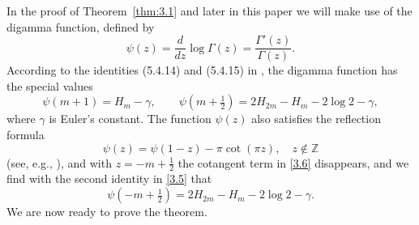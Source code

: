\documentclass{amsart}
\theoremstyle{definition}
\theoremstyle{remark}
\numberwithin{equation}{section}
\begin{document}
In the proof of Theorem~\ref{thm:3.1} and later in this paper we will make use
of the digamma function, defined by
\begin{equation}\label{3.4}
\psi(z)=\frac{d}{dz}\log{\Gamma(z)} = \frac{\Gamma'(z)}{\Gamma(z)}.
\end{equation}
According to the identities (5.4.14) and (5.4.15) in \cite{DLMF}, the digamma
function has the special values
\begin{equation}\label{3.5}
\psi(m+1) = H_m-\gamma,\qquad\psi(m+\tfrac{1}{2}) = 2H_{2m}-H_m-2\log{2}-\gamma,
\end{equation}
where $\gamma$ is Euler's constant. The function $\psi(z)$ also satisfies the
reflection formula
\begin{equation}\label{3.6}
\psi(z) = \psi(1-z)-\pi\cot(\pi z),\quad z\not\in{\mathbb Z}
\end{equation}
(see, e.g., \cite[eq.~5.5.4]{DLMF}), and with $z=-m+\frac{1}{2}$ the cotangent
term in \eqref{3.6} disappears, and we find with the second identity in 
\eqref{3.5} that 
\begin{equation}\label{3.7}
\psi(-m+\tfrac{1}{2}) = 2H_{2m}-H_m-2\log{2}-\gamma.
\end{equation}
We are now ready to prove the theorem.
\end{document}

